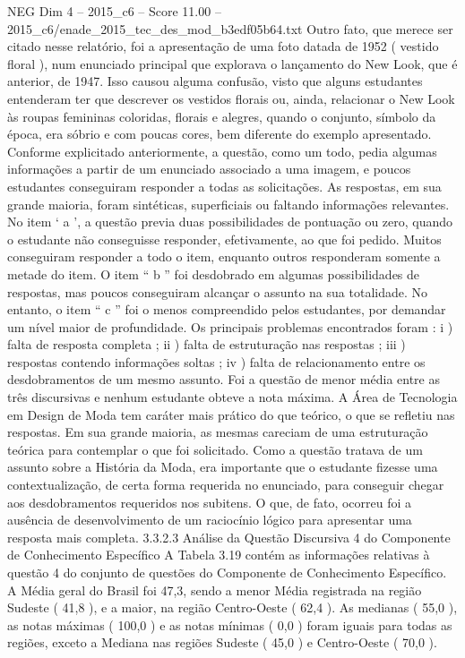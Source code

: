 \begin{textsample}{NEG Dim 4 – 2015\_c6 – Score 11.00 – 2015\_c6/enade\_2015\_tec\_des\_mod\_b3edf05b64.txt}
Outro fato, que merece ser citado nesse relatório, foi a apresentação de uma foto datada de 1952 ( vestido floral ), num enunciado principal que explorava o lançamento do New Look, que é anterior, de 1947.
Isso causou alguma confusão, visto que alguns estudantes entenderam ter que descrever os vestidos florais ou, ainda, relacionar o New Look às roupas femininas coloridas, florais e alegres, quando o conjunto, símbolo da época, era sóbrio e com poucas cores, bem diferente do exemplo apresentado.
Conforme explicitado anteriormente, a questão, como um todo, pedia algumas informações a partir de um enunciado associado a uma imagem, e poucos estudantes conseguiram responder a todas as solicitações.
As respostas, em sua grande maioria, foram sintéticas, superficiais ou faltando informações relevantes.
No item ‘ a ’, a questão previa duas possibilidades de pontuação ou zero, quando o estudante não conseguisse responder, efetivamente, ao que foi pedido.
Muitos conseguiram responder a todo o item, enquanto outros responderam somente a metade do item.
O item “ b ” foi desdobrado em algumas possibilidades de respostas, mas poucos conseguiram alcançar o assunto na sua totalidade.
No entanto, o item “ c ” foi o menos compreendido pelos estudantes, por demandar um nível maior de profundidade.
Os principais problemas encontrados foram : i ) falta de resposta completa ; ii ) falta de estruturação nas respostas ; iii ) respostas contendo informações soltas ; iv ) falta de relacionamento entre os desdobramentos de um mesmo assunto.
Foi a questão de menor média entre as três discursivas e nenhum estudante obteve a nota máxima.
A Área de Tecnologia em Design de Moda tem caráter mais prático do que teórico, o que se refletiu nas respostas.
Em sua grande maioria, as mesmas careciam de uma estruturação teórica para contemplar o que foi solicitado.
Como a questão tratava de um assunto sobre a História da Moda, era importante que o estudante fizesse uma contextualização, de certa forma requerida no enunciado, para conseguir chegar aos desdobramentos requeridos nos subitens.
O que, de fato, ocorreu foi a ausência de desenvolvimento de um raciocínio lógico para apresentar uma resposta mais completa. 3.3.2.3 Análise da Questão Discursiva 4 do Componente de Conhecimento Específico A Tabela 3.19 contém as informações relativas à questão 4 do conjunto de questões do Componente de Conhecimento Específico.
A Média geral do Brasil foi 47,3, sendo a menor Média registrada na região Sudeste ( 41,8 ), e a maior, na região Centro-Oeste ( 62,4 ).
As medianas ( 55,0 ), as notas máximas ( 100,0 ) e as notas mínimas ( 0,0 ) foram iguais para todas as regiões, exceto a Mediana nas regiões Sudeste ( 45,0 ) e Centro-Oeste ( 70,0 ).

\end{textsample}
